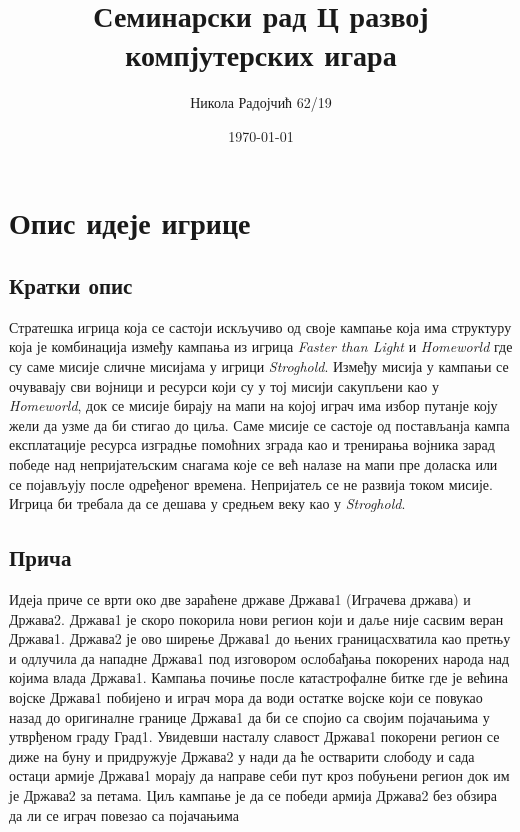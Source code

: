 \documentclass[11pt,a4paper]{report}
\title{Семинарски рад Ц развој компјутерских игара}
\author{Никола Радојчић 62/19}
\date{\today}
\begin{document}
\maketitle
\newpage

\tableofcontents
\newpage

\chapter{Опис идеје игрице}

\section{Кратки опис}
Стратешка игрица која се састоји искључиво од своје кампање која има структуру која је комбинација између кампања из игрица \emph{Faster than Light} и \emph{Homeworld} где су саме мисије сличне мисијама у игрици \emph{Stroghold}. Између мисија у кампањи се очувавају сви војници и ресурси који су у тој мисији сакупљени као у \emph{Homeworld}, док се мисије бирају на мапи на којој играч има избор путанје коју жели да узме да би стигао до циља. Саме мисије се састоје од постављанја кампа експлатације ресурса изградње помоћних зграда као и тренирања војника зарад победе над непријатељским снагама које се већ налазе на мапи пре доласка или се појављују после одређеног времена. Непријатељ се не развија током мисије. Игрица би требала да се дешава у средњем веку као у \emph{Stroghold}.

\section{Прича}
Идеја приче се врти око две зараћене државе Држава1 (Играчева држава) и Држава2. Држава1 је скоро покорила нови регион који и даље није сасвим веран Држава1. Држава2 је ово ширење Држава1 до њених границасхватила као претњу и одлучила да нападне Држава1 под изговором ослобађања покорених народа над којима влада Држава1. Кампања почиње после катастрофалне битке где је већина војске Држава1 побијено и играч мора да води остатке војске који се повукао назад до оригиналне границе Држава1 да би се спојио са својим појачањима у утврђеном граду Град1. Увидевши насталу славост Држава1 покорени регион се диже на буну и придружује Држава2 у нади да ће остварити слободу и сада остаци армије Држава1 морају да направе себи пут кроз побуњени регион док им је Држава2 за петама. Циљ кампање је да се победи армија Држава2 без обзира да ли се играч повезао са појачањима
\end{document}
